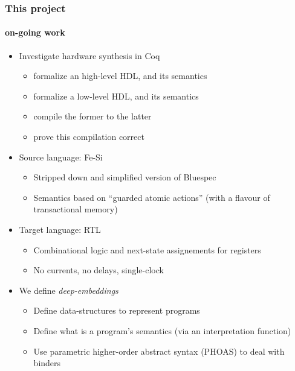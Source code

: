 \documentclass[9pt]{beamer}
\begin{document}
\begin{frame}
  \frametitle{This project}
  \framesubtitle{on-going work}
  \begin{itemize}
  \item  Investigate hardware synthesis in Coq
    
    \begin{itemize}
    \item formalize an high-level HDL, and its semantics
    \item formalize a low-level HDL, and its semantics
    \item compile the former to the latter
    \item prove this compilation correct
    \end{itemize}

    \pause
    
  \item Source language: \alert{Fe-Si}
    \begin{itemize}
    \item Stripped down and simplified version of \alert{Bluespec}
    \item Semantics based on ``guarded atomic actions'' (with a flavour of transactional memory)
    \end{itemize}
    
    \pause
    
  \item Target language: RTL
    \begin{itemize}
    \item Combinational logic and next-state assignements for registers
    \item No currents, no delays, single-clock
    \end{itemize}
    
    \pause
    
  \item We define \emph{deep-embeddings}
    \begin{itemize}
    \item Define data-structures to represent programs
    \item Define what is a program's semantics (via an interpretation function) 
    \item Use \alert{parametric higher-order abstract syntax} (PHOAS) to deal with binders
    \end{itemize}
  \end{itemize}
\end{frame}
\end{document}
